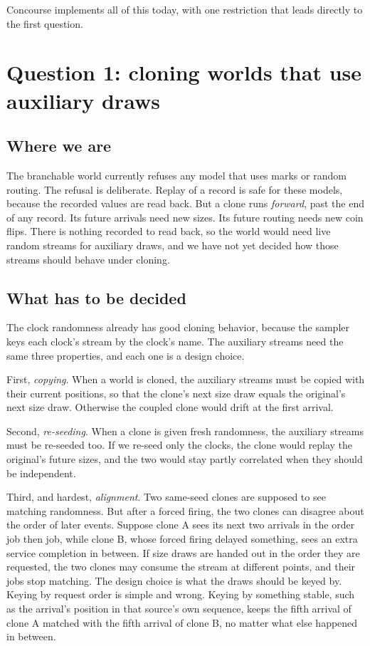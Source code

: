 \documentclass[11pt]{article}
\begin{document}
Concourse implements all of this today, with one restriction that leads
directly to the first question.

\section{Question 1: cloning worlds that use auxiliary draws}

\subsection{Where we are}

The branchable world currently refuses any model that uses marks or random
routing. The refusal is deliberate. Replay of a record is safe for these
models, because the recorded values are read back. But a clone runs
\emph{forward}, past the end of any record. Its future arrivals need new
sizes. Its future routing needs new coin flips. There is nothing recorded
to read back, so the world would need live random streams for auxiliary
draws, and we have not yet decided how those streams should behave under
cloning.

\subsection{What has to be decided}

The clock randomness already has good cloning behavior, because the
sampler keys each clock's stream by the clock's name. The auxiliary
streams need the same three properties, and each one is a design choice.

First, \emph{copying}. When a world is cloned, the auxiliary streams must
be copied with their current positions, so that the clone's next size draw
equals the original's next size draw. Otherwise the coupled clone would
drift at the first arrival.

Second, \emph{re-seeding}. When a clone is given fresh randomness, the
auxiliary streams must be re-seeded too. If we re-seed only the clocks,
the clone would replay the original's future sizes, and the two would stay
partly correlated when they should be independent.

Third, and hardest, \emph{alignment}. Two same-seed clones are supposed to
see matching randomness. But after a forced firing, the two clones can
disagree about the order of later events. Suppose clone A sees its next
two arrivals in the order job then job, while clone B, whose forced firing
delayed something, sees an extra service completion in between. If size
draws are handed out in the order they are requested, the two clones may
consume the stream at different points, and their jobs stop matching. The
design choice is what the draws should be keyed by. Keying by request
order is simple and wrong. Keying by something stable, such as the
arrival's position in that source's own sequence, keeps the fifth arrival
of clone A matched with the fifth arrival of clone B, no matter what else
happened in between.
\end{document}
